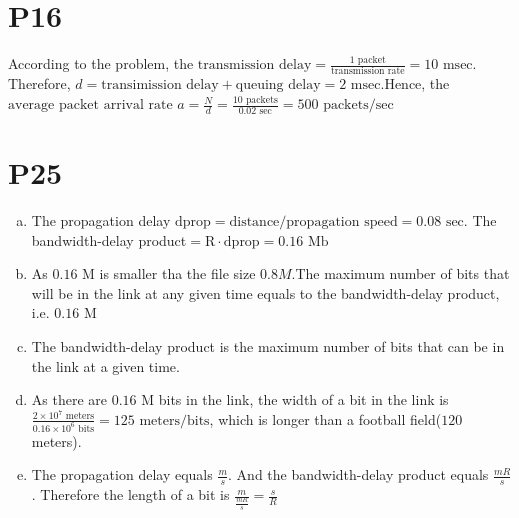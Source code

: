 \documentclass[a4paper, 11pt]{article}
\begin{document}
\section*{P16}
According to the problem, the $\text{transmission delay} = \frac{1 \text{ packet}}{\text{transmission rate}} = 10\text{ msec}$. Therefore, $d=\text{transimission delay} + \text{queuing delay} = 2\text{ msec}$.Hence, the $\text{average packet arrival rate } a=\frac{N}{d} = \frac{10 \text{ packets}}{0.02 \text{ sec}} = 500 \text{ packets/sec}$

\section*{P25}

\begin{enumerate}[a.]
    \item The propagation delay $\text{dprop} = \text{distance}/\text{propagation speed} = 0.08\text{ sec}$. The bandwidth-delay product$=\text{R}\cdot \text{dprop}=0.16\text{ Mb}$
    \item As $0.16$ M is smaller tha the file size $0.8M$.The maximum number of bits that will be in the link at any given time equals to the bandwidth-delay product, i.e. $0.16$ M
    \item The bandwidth-delay product is the maximum number of bits that can be in the link at a given time.
    \item As there are $0.16$ M bits in the link, the width of a bit in the link is $\frac{2\times 10^7 \text{ meters}}{0.16\times 10^6 \text{ bits}} = 125 \text{ meters/bits}$, which is longer than a football field($120$ meters).
    \item The propagation delay equals $\frac{m}{s}$. And the bandwidth-delay product equals $\frac{mR}{s}$. Therefore the length of a bit is $\frac{m}{\frac{mR}{s}} = \frac{s}{R}$
\end{enumerate}
\end{document}
